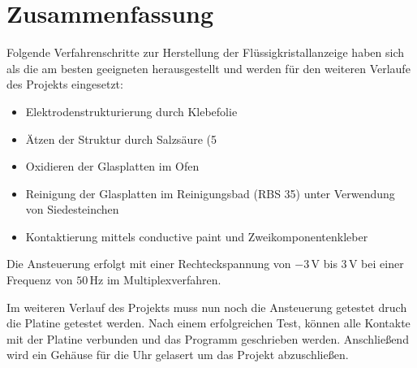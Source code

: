 \section{Zusammenfassung}

Folgende Verfahrenschritte zur Herstellung der Flüssigkristallanzeige haben sich als die am besten geeigneten herausgestellt und werden für den weiteren Verlaufe des Projekts eingesetzt:

\begin{itemize}
\item Elektrodenstrukturierung durch Klebefolie
\item Ätzen der Struktur durch Salzsäure (5%
\item Oxidieren der Glasplatten im Ofen
\item Reinigung der Glasplatten im Reinigungsbad (RBS 35) unter Verwendung von Siedesteinchen
\item Kontaktierung mittels conductive paint und Zweikomponentenkleber\\
\end{itemize}

Die Ansteuerung erfolgt mit
einer Rechteckspannung von \(-3\,\textrm{V}\) bis \(3\,\textrm{V}\)
bei einer Frequenz von \(50\,\textrm{Hz}\) im
Multiplexverfahren.

Im weiteren Verlauf des Projekts muss nun noch die Ansteuerung getestet druch die Platine getestet werden. Nach einem erfolgreichen Test, können alle Kontakte mit der Platine verbunden und das Programm geschrieben werden. Anschließend wird ein Gehäuse für die Uhr gelasert um das Projekt abzuschließen.